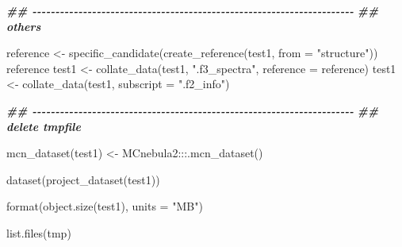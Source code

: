 \documentclass[
]{article}
\newenvironment{Shaded}{\begin{snugshade}}{\end{snugshade}}
\newcommand{\AttributeTok}[1]{\textcolor[rgb]{0.77,0.63,0.00}{#1}}
\newcommand{\DocumentationTok}[1]{\textcolor[rgb]{0.56,0.35,0.01}{\textbf{\textit{#1}}}}
\newcommand{\FunctionTok}[1]{\textcolor[rgb]{0.00,0.00,0.00}{#1}}
\newcommand{\NormalTok}[1]{#1}
\newcommand{\OtherTok}[1]{\textcolor[rgb]{0.56,0.35,0.01}{#1}}
\newcommand{\SpecialCharTok}[1]{\textcolor[rgb]{0.00,0.00,0.00}{#1}}
\newcommand{\StringTok}[1]{\textcolor[rgb]{0.31,0.60,0.02}{#1}}
\begin{document}
\begin{Shaded}
\begin{Highlighting}[]
\DocumentationTok{\#\# {-}{-}{-}{-}{-}{-}{-}{-}{-}{-}{-}{-}{-}{-}{-}{-}{-}{-}{-}{-}{-}{-}{-}{-}{-}{-}{-}{-}{-}{-}{-}{-}{-}{-}{-}{-}{-}{-}{-}{-}{-}{-}{-}{-}{-}{-}{-}{-}{-}{-}{-}{-}{-}{-}{-}{-}{-}{-}{-}{-}{-}{-}{-}{-}{-}{-}{-}{-}{-}{-} }
\DocumentationTok{\#\# others}

\NormalTok{reference }\OtherTok{\textless{}{-}} \FunctionTok{specific\_candidate}\NormalTok{(}\FunctionTok{create\_reference}\NormalTok{(test1, }\AttributeTok{from =} \StringTok{"structure"}\NormalTok{))}
\NormalTok{reference}
\NormalTok{test1 }\OtherTok{\textless{}{-}} \FunctionTok{collate\_data}\NormalTok{(test1, }\StringTok{".f3\_spectra"}\NormalTok{, }\AttributeTok{reference =}\NormalTok{ reference)}
\NormalTok{test1 }\OtherTok{\textless{}{-}} \FunctionTok{collate\_data}\NormalTok{(test1, }\AttributeTok{subscript =} \StringTok{".f2\_info"}\NormalTok{)}

\DocumentationTok{\#\# {-}{-}{-}{-}{-}{-}{-}{-}{-}{-}{-}{-}{-}{-}{-}{-}{-}{-}{-}{-}{-}{-}{-}{-}{-}{-}{-}{-}{-}{-}{-}{-}{-}{-}{-}{-}{-}{-}{-}{-}{-}{-}{-}{-}{-}{-}{-}{-}{-}{-}{-}{-}{-}{-}{-}{-}{-}{-}{-}{-}{-}{-}{-}{-}{-}{-}{-}{-}{-}{-} }
\DocumentationTok{\#\# delete tmpfile}

\FunctionTok{mcn\_dataset}\NormalTok{(test1) }\OtherTok{\textless{}{-}}\NormalTok{ MCnebula2}\SpecialCharTok{:::}\FunctionTok{.mcn\_dataset}\NormalTok{()}

\FunctionTok{dataset}\NormalTok{(}\FunctionTok{project\_dataset}\NormalTok{(test1))}

\FunctionTok{format}\NormalTok{(}\FunctionTok{object.size}\NormalTok{(test1), }\AttributeTok{units =} \StringTok{"MB"}\NormalTok{)}

\FunctionTok{list.files}\NormalTok{(tmp)}
\end{Highlighting}
\end{Shaded}
\end{document}
